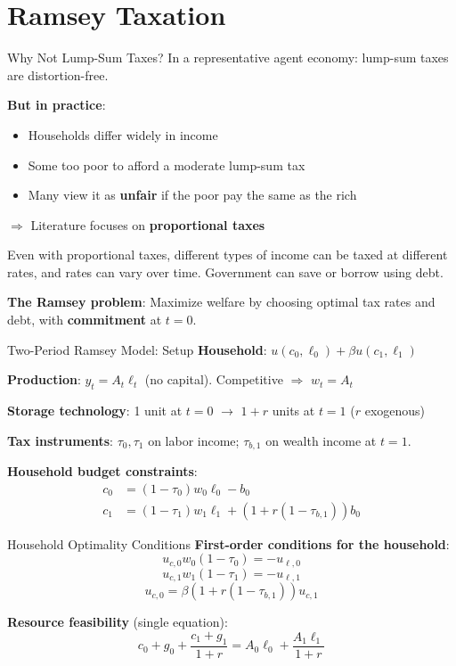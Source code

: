 \documentclass[blue]{beamer}
\begin{document}
\section{Ramsey Taxation}

\begin{frame}{Why Not Lump-Sum Taxes?}
	In a representative agent economy: lump-sum taxes are distortion-free.
	

	\textbf{But in practice}:
	\begin{itemize}
		\item Households differ widely in income
		\item Some too poor to afford a moderate lump-sum tax
		\item Many view it as \textbf{unfair} if the poor pay the same as the rich
	\end{itemize}
	
	$\Rightarrow$ Literature focuses on \textbf{proportional taxes} \
	
	\bigskip
	Even with proportional taxes, different types of income can be taxed at different rates, and rates can vary over time. Government can save or borrow using debt.

	\textbf{The Ramsey problem}: Maximize welfare by choosing optimal tax rates and debt, with \textbf{commitment} at $t = 0$.
\end{frame}

\begin{frame}{Two-Period Ramsey Model: Setup}
	\textbf{Household}: $u(c_0, \ell_0) + \beta u(c_1, \ell_1)$
	
	\textbf{Production}: $y_t = A_t \ell_t$ (no capital). Competitive $\Rightarrow$ $w_t = A_t$ 
	
	\textbf{Storage technology}: 1 unit at $t=0$ $\to$ $1+r$ units at $t=1$ ($r$ exogenous)
	
	\bigskip
	\textbf{Tax instruments}: $\tau_0, \tau_1$ on labor income; $\tau_{b,1}$ on wealth income at $t=1$.
	
	\bigskip
	\textbf{Household budget constraints}:
	\begin{align*}
		c_0 &= (1-\tau_0) w_0 \ell_0 - b_0 \\
		c_1 &= (1-\tau_1) w_1 \ell_1 + (1+r(1-\tau_{b,1})) b_0
	\end{align*}
\end{frame}

\begin{frame}{Household Optimality Conditions}
	\textbf{First-order conditions for the household}:
$$
		u_{c,0} w_0 (1-\tau_0) = -u_{\ell,0} 
		$$
		$$
		u_{c,1} w_1 (1-\tau_1) = -u_{\ell,1} 
		$$
		$$
		u_{c,0} = \beta(1+r(1-\tau_{b,1})) u_{c,1}
$$
	
	\bigskip
	\textbf{Resource feasibility} (single equation):
	\[
	c_0 + g_0 + \frac{c_1 + g_1}{1+r} = A_0 \ell_0 + \frac{A_1 \ell_1}{1+r}
	\]
\end{frame}
\end{document}
